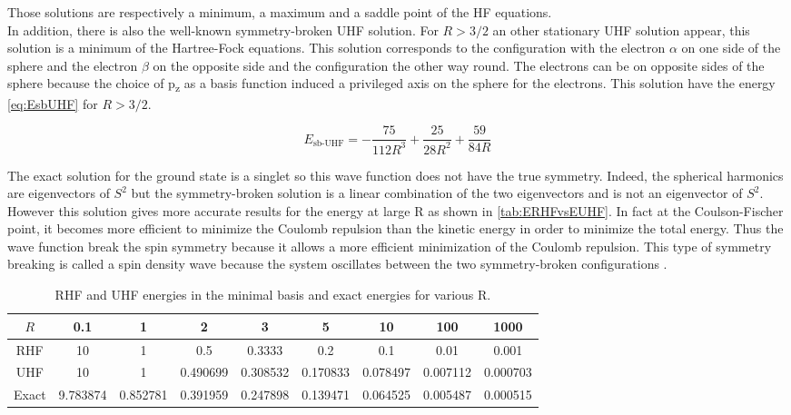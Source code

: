 \documentclass[11pt,a4paper]{article}
\begin{document}
Those solutions are respectively a minimum, a maximum and a saddle point of the HF equations.\\

In addition, there is also the well-known symmetry-broken UHF solution. For $R>3/2$ an other stationary UHF solution appear, this solution is a minimum of the Hartree-Fock equations. This solution corresponds to the configuration with the electron $\alpha$ on one side of the sphere and the electron $\beta$ on the opposite side and the configuration the other way round. The electrons can be on opposite sides of the sphere because the choice of p\textsubscript{z} as a basis function induced a privileged axis on the sphere for the electrons. This solution have the energy \eqref{eq:EsbUHF} for $R>3/2$.

\begin{equation}\label{eq:EsbUHF}
E_{\text{sb-UHF}}=-\frac{75}{112R^3}+\frac{25}{28R^2}+\frac{59}{84R}
\end{equation}

The exact solution for the ground state is a singlet so this wave function does not have the true symmetry. Indeed, the spherical harmonics are eigenvectors of $S^2$ but the symmetry-broken solution is a linear combination of the two eigenvectors and is not an eigenvector of $S^2$. However this solution gives more accurate results for the energy at large R as shown in \autoref{tab:ERHFvsEUHF}. In fact at the Coulson-Fischer point, it becomes more efficient to minimize the Coulomb repulsion than the kinetic energy in order to minimize the total energy. Thus the wave function break the spin symmetry because it allows a more efficient minimization of the Coulomb repulsion. This type of symmetry breaking is called a spin density wave because the system oscillates between the two symmetry-broken configurations \cite{GiulianiBook}.

\begin{table}[h!]
\centering
\caption{\centering RHF and UHF energies in the minimal basis and exact energies for various R.}
\begin{tabular}{c c c c c c c c c}
$R$ & 0.1 & 1 & 2 & 3 & 5 & 10 & 100 & 1000 \\
\hline
RHF & 10 & 1 & 0.5 & 0.3333 & 0.2 & 0.1 & 0.01 & 0.001 \\
\hline
UHF & 10 & 1 & 0.490699 & 0.308532 & 0.170833 & 0.078497 & 0.007112 & 0.000703 \\
\hline
Exact & 9.783874 & 0.852781 & 0.391959 & 0.247898 & 0.139471 & 0.064525 & 0.005487 & 0.000515 \\
\end{tabular}
\label{tab:ERHFvsEUHF}
\end{table}
\end{document}
